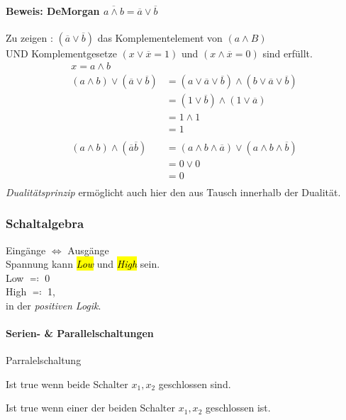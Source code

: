 \documentclass[a4paper]{scrartcl}
\begin{document}
				 \paragraph{Beweis: DeMorgan \( \overline{a \wedge b} = \overline{a} \vee \overline{b} \)} 
				 Zu zeigen : \( (\overline{a} \vee \overline{b}) \) das Komplementelement von \( (a \wedge B) \)\\
				UND Komplementgesetze \( (x \vee \overline{x} = 1) \) und \( (x \wedge \overline{x} = 0 ) \) sind erfüllt.\\
				 \begin{align*}
				 	x = a \wedge b\\
				 	(a \wedge b) \vee ( \overline{a} \vee \overline{b} ) &= (a \vee \overline{a} \vee \overline{b} ) \wedge (b \vee \overline{a} \vee \overline{b} ) \\
				 	&= (1 \vee \overline{b}) \wedge (1 \vee \overline{a} ) \\
				 	&= 1 \wedge 1 \\
				 	&= 1\\
				 	\\
				 	(a \wedge b) \wedge ( \overline{a}\overline{b}) &= (a \wedge b \wedge \overline{a}) \vee (a \wedge b \wedge \overline{b}) \\
				 	&= 0 \vee 0\\
				 	&= 0\\
				 \end{align*}
				 \emph{Dualitätsprinzip} ermöglicht auch hier den aus Tausch innerhalb der Dualität.\\
				 
				 \subsubsection{Schaltalgebra}
				 Eingänge \( \iff \) Ausgänge \\
				 Spannung kann \emph{\hl{Low}} und \emph{\hl{High}} sein. \\
				 Low \( \eqqcolon \) 0 \\
				 High \( \eqqcolon \) 1,\\
				 in der \emph{positiven Logik}.\\
				 
				 \paragraph{Serien- \& Parallelschaltungen}
				 \begin{labeling}{Parralelschaltung}
				 	\item[Serienschaltung] Ist true wenn beide Schalter \(x_1, x_2 \) geschlossen sind.
				 	\item[Parralelschaltung] Ist true wenn einer der beiden Schalter \(x_1, x_2 \) geschlossen ist.
				 \end{labeling}
				 
\end{document}
